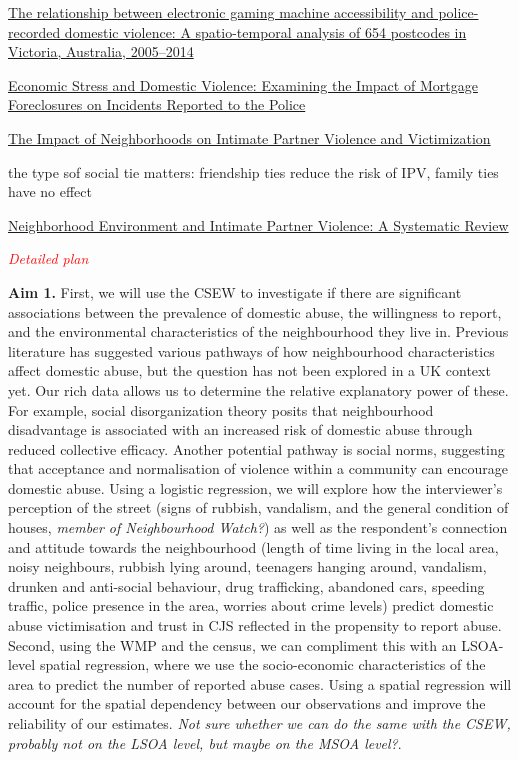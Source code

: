 \documentclass[11pt, a4paper]{article}
\begin{document}
\href{https://www.sciencedirect.com/science/article/abs/pii/S0277953616302891}{The relationship between electronic gaming machine accessibility and police-recorded domestic violence: A spatio-temporal analysis of 654 postcodes in Victoria, Australia, 2005–2014}

\href{https://journals.sagepub.com/doi/abs/10.1177/1525107115623938}{Economic Stress and Domestic Violence: Examining the Impact of Mortgage Foreclosures on Incidents Reported to the Police }

\href{https://journals.sagepub.com/doi/abs/10.1177/1524838012445641?journalCode=tvaa}{
The Impact of Neighborhoods on Intimate Partner Violence and Victimization
}

the type sof social tie matters: friendship ties reduce the risk of IPV, family ties have no effect

\href{https://journals.sagepub.com/doi/abs/10.1177/1524838013515758}{Neighborhood Environment and Intimate Partner Violence: A Systematic Review }

\textcolor{red}{\textit{Detailed plan}}

\textbf{Aim 1.} First, we will use the CSEW to investigate if there are significant associations between the prevalence of domestic abuse, the willingness to report, and the environmental characteristics of the neighbourhood they live in. Previous literature has suggested various pathways of how neighbourhood characteristics affect domestic abuse, but the question has not been explored in a UK context yet. Our rich data allows us to determine the relative explanatory power of these. For example, social disorganization theory posits that neighbourhood disadvantage is associated with an increased risk of domestic abuse through reduced collective efficacy. Another potential pathway is social norms, suggesting that acceptance and normalisation of violence within a community can encourage domestic abuse. Using a logistic regression, we will explore how the interviewer's perception of the street (signs of rubbish, vandalism, and the general condition of houses, \textit{member of Neighbourhood Watch?}) as well as the respondent's connection and attitude towards the neighbourhood (length of time living in the local area, noisy neighbours, rubbish lying around, teenagers hanging around, vandalism, drunken and anti-social behaviour, drug trafficking, abandoned cars, speeding traffic, police presence in the area, worries about crime levels) predict domestic abuse victimisation and trust in CJS reflected in the propensity to report abuse. Second, using the WMP and the census, we can compliment this with an LSOA-level spatial regression, where we use the socio-economic characteristics of the area to predict the number of reported abuse cases. Using a spatial regression will account for the spatial dependency between our observations and improve the reliability of our estimates. \textit{Not sure whether we can do the same with the CSEW, probably not on the LSOA level, but maybe on the MSOA level?}.
\end{document}
